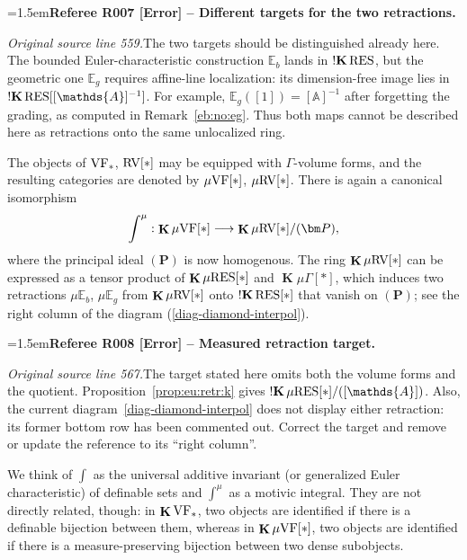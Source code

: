 \documentclass[12pt]{amsart}
\newcommand{\RefereeRemark}[4]{%
  \par\medskip\begingroup\normalfont\small\color{RefereePurple}%
  \emergencystretch=1.5em\noindent\textbf{Referee R#1 [#2] -- #3.}\par\nobreak\noindent #4\par
  \endgroup\medskip
}
\theoremstyle{plain}
\theoremstyle{definition}
\theoremstyle{remark}
\numberwithin{equation}{section}
\theoremstyle{plain}
\newcommand{\VF}{\textup{VF}}
\newcommand{\RV}{\textup{RV}}
\newcommand{\A}{\mathds{A}}
\newcommand{\0}{\emptyset}
\newcommand{\bb}[1]{\mathbb{#1}}
\newcommand{\fun}{\longrightarrow}
\newcommand{\mgVF}{{\mu} {\VF}}
\newcommand{\mgRV}{{\mu}{\RV}}
\newcommand{\mG}{{\mu}{\Gamma}}
\newcommand{\RES}{\textup{RES}}
\newcommand{\mgRES}{{\mu}{\RES}}
\newcommand{\mgE}{{\mu}{\bb E}}
\DeclareMathOperator{\ggk}{\mathbf{K}}
\DeclareMathOperator{\sggk}{!\mathbf{K}}
\begin{document}
\RefereeRemark{007}{Error}{Different targets for the two retractions}{%
\textit{Original source line 559.}\quad The two targets should be distinguished already here. The bounded Euler-characteristic construction $\bb E_b$ lands in $\sggk\RES$, but the geometric one $\bb E_g$ requires affine-line localization: its dimension-free image lies in $\sggk\RES[[\A]^{-1}]$. For example, $\bb E_g([1])=[\A]^{-1}$ after forgetting the grading, as computed in Remark~\ref{eb:no:eg}. Thus both maps cannot be described here as retractions onto the same unlocalized ring.
}


The objects of $\VF_*$, $\RV[*]$ may be equipped with $\Gamma$-volume forms, and the resulting categories are denoted by $\mgVF[*]$, $\mgRV[*]$. There is again a  canonical isomorphism
\[
\int^\mu : \ggk\mgVF[*] \fun \ggk\mgRV[*]/(\bm P),
\]
where the principal ideal $(\bm P)$ is now homogenous. The ring $\ggk\mgRV[*]$ can  be expressed as a tensor product of  $\ggk \mgRES[*]$ and $\ggk \mG[*]$, which induces two retractions $\mgE_ {b}$, $\mgE_{g}$ from $\ggk\mgRV[*]$ onto $\sggk \RES[*]$ that vanish on $(\bm P)$; see the right column of the diagram (\ref{diag-diamond-interpol}).

\RefereeRemark{008}{Error}{Measured retraction target}{%
\textit{Original source line 567.}\quad The target stated here omits both the volume forms and the quotient. Proposition~\ref{prop:eu:retr:k} gives $\sggk\mgRES[*]/([\A])$. Also, the current diagram~\eqref{diag-diamond-interpol} does not display either retraction: its former bottom row has been commented out. Correct the target and remove or update the reference to its ``right column''. 
}

We think of $\int$ as the universal additive invariant (or generalized Euler characteristic) of definable sets and $\int^\mu$ as a motivic integral. They are not directly related, though: in  $\ggk\VF_*$, two objects are identified if there is a definable bijection between them, whereas in $\ggk\mgVF[*]$, two objects are identified if there is a measure-preserving bijection between two dense subobjects.
\end{document}
